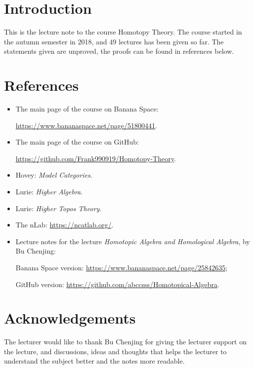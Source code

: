\section*{Introduction}

This is the lecture note to the course Homotopy Theory. 
The course started in the autumn semester in 2018, and 49 lectures has been given so far.
The statements given are unproved, the proofs can be found in references below.

\section*{References}

\begin{itemize}
\item The main page of the course on Banana Space: 

\url{https://www.bananaspace.net/page/51800441}.
\item The main page of the course on GitHub: 

\url{https://github.com/Frank990919/Homotopy-Theory}.
\item Hovey: \textit{Model Categories}.
\item Lurie: \textit{Higher Algebra}.
\item Lurie: \textit{Higher Topos Theory}.
\item The nLab: \url{https://ncatlab.org/}.
\item Lecture notes for the lecture \textit{Homotopic Algebra and Homological Algebra}, by Bu Chenjing:

Banana Space version: \url{https://www.bananaspace.net/page/25842635};

GitHub version: \url{https://github.com/abccsss/Homotopical-Algebra}.
\end{itemize}

\section*{Acknowledgements}

The lecturer would like to thank Bu Chenjing for giving the lecturer support on the lecture, and discussions, ideas and thoughts 
that helps the lecturer to understand the subject better and the notes more readable.